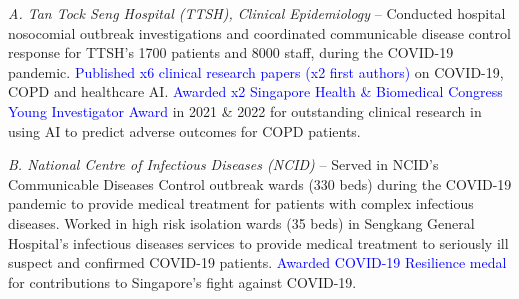 \documentclass[letterpaper,10pt,oneside]{article}
\begin{document}
\begin{body}
\textit{A. Tan Tock Seng Hospital (TTSH), Clinical Epidemiology}
\hfill
{} --
\BulletItem
Conducted hospital nosocomial outbreak investigations and coordinated communicable disease control response for TTSH's 1700 patients and 8000 staff, during the COVID-19 pandemic.
\BulletItem
\textcolor{blue}{Published x6 clinical research papers (x2 first authors)} on COVID-19, COPD and healthcare AI.
\BulletItem
\textcolor{blue}{Awarded x2 Singapore Health \& Biomedical Congress Young Investigator Award} in 2021 \& 2022 for outstanding clinical research in using AI to predict adverse outcomes for COPD patients.

\BigGap
\textit{B. National Centre of Infectious Diseases (NCID)}
\hfill
{} --
\BulletItem
Served in NCID's Communicable Diseases Control outbreak wards (330 beds) during the COVID-19 pandemic to provide medical treatment for patients with complex infectious diseases.
\BulletItem
Worked in high risk isolation wards (35 beds) in Sengkang General Hospital's infectious diseases services to provide medical treatment to seriously ill suspect and confirmed COVID-19 patients.
\BulletItem
\textcolor{blue}{Awarded COVID-19 Resilience medal} for contributions to Singapore's fight against COVID-19.




\end{body}
\end{document}
